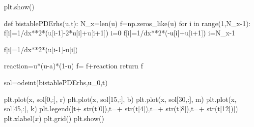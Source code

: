 \documentclass[
  letterpaper,
  DIV=11,
  numbers=noendperiod]{scrreprt}
\newenvironment{Shaded}{\begin{snugshade}}{\end{snugshade}}
\newcommand{\BuiltInTok}[1]{\textcolor[rgb]{0.00,0.23,0.31}{#1}}
\newcommand{\ControlFlowTok}[1]{\textcolor[rgb]{0.00,0.23,0.31}{#1}}
\newcommand{\DecValTok}[1]{\textcolor[rgb]{0.68,0.00,0.00}{#1}}
\newcommand{\KeywordTok}[1]{\textcolor[rgb]{0.00,0.23,0.31}{#1}}
\newcommand{\NormalTok}[1]{\textcolor[rgb]{0.00,0.23,0.31}{#1}}
\newcommand{\OperatorTok}[1]{\textcolor[rgb]{0.37,0.37,0.37}{#1}}
\newcommand{\StringTok}[1]{\textcolor[rgb]{0.13,0.47,0.30}{#1}}
\theoremstyle{plain}
\theoremstyle{definition}
\theoremstyle{plain}
\theoremstyle{remark}
\begin{document}
\begin{Shaded}
\begin{Highlighting}[]
\NormalTok{plt.show()}


\KeywordTok{def}\NormalTok{ bistablePDErhs(u,t):}
\NormalTok{    N\_x}\OperatorTok{=}\BuiltInTok{len}\NormalTok{(u)}
\NormalTok{    f}\OperatorTok{=}\NormalTok{np.zeros\_like(u)}
    \ControlFlowTok{for}\NormalTok{ i }\KeywordTok{in} \BuiltInTok{range}\NormalTok{(}\DecValTok{1}\NormalTok{,N\_x}\OperatorTok{{-}}\DecValTok{1}\NormalTok{):}
\NormalTok{      f[i]}\OperatorTok{=}\DecValTok{1}\OperatorTok{/}\NormalTok{dx}\OperatorTok{**}\DecValTok{2}\OperatorTok{*}\NormalTok{(u[i}\OperatorTok{{-}}\DecValTok{1}\NormalTok{]}\OperatorTok{{-}}\DecValTok{2}\OperatorTok{*}\NormalTok{u[i]}\OperatorTok{+}\NormalTok{u[i}\OperatorTok{+}\DecValTok{1}\NormalTok{]) }
\NormalTok{    i}\OperatorTok{=}\DecValTok{0}
\NormalTok{    f[i]}\OperatorTok{=}\DecValTok{1}\OperatorTok{/}\NormalTok{dx}\OperatorTok{**}\DecValTok{2}\OperatorTok{*}\NormalTok{(}\OperatorTok{{-}}\NormalTok{u[i]}\OperatorTok{+}\NormalTok{u[i}\OperatorTok{+}\DecValTok{1}\NormalTok{]) }
\NormalTok{    i}\OperatorTok{=}\NormalTok{N\_x}\OperatorTok{{-}}\DecValTok{1}

\NormalTok{    f[i]}\OperatorTok{=}\DecValTok{1}\OperatorTok{/}\NormalTok{dx}\OperatorTok{**}\DecValTok{2}\OperatorTok{*}\NormalTok{(u[i}\OperatorTok{{-}}\DecValTok{1}\NormalTok{]}\OperatorTok{{-}}\NormalTok{u[i])}

\NormalTok{    reaction}\OperatorTok{=}\NormalTok{u}\OperatorTok{*}\NormalTok{(u}\OperatorTok{{-}}\NormalTok{a)}\OperatorTok{*}\NormalTok{(}\DecValTok{1}\OperatorTok{{-}}\NormalTok{u) }
\NormalTok{    f}\OperatorTok{=}\NormalTok{ f}\OperatorTok{+}\NormalTok{reaction }
    \ControlFlowTok{return}\NormalTok{ f  }

\NormalTok{sol}\OperatorTok{=}\NormalTok{odeint(bistablePDErhs,u\_0,t)}

\NormalTok{plt.plot(x, sol[}\DecValTok{0}\NormalTok{,:], }\StringTok{\textquotesingle{}r\textquotesingle{}}\NormalTok{)}
\NormalTok{plt.plot(x, sol[}\DecValTok{15}\NormalTok{,:], }\StringTok{\textquotesingle{}b\textquotesingle{}}\NormalTok{)}
\NormalTok{plt.plot(x, sol[}\DecValTok{30}\NormalTok{,:], }\StringTok{\textquotesingle{}m\textquotesingle{}}\NormalTok{)}
\NormalTok{plt.plot(x, sol[}\DecValTok{45}\NormalTok{,:], }\StringTok{\textquotesingle{}k\textquotesingle{}}\NormalTok{)}
\NormalTok{plt.legend([}\StringTok{\textquotesingle{}t\textquotesingle{}}\OperatorTok{+} \BuiltInTok{str}\NormalTok{(t[}\DecValTok{0}\NormalTok{]),}\StringTok{\textquotesingle{}t=\textquotesingle{}}\OperatorTok{+} \BuiltInTok{str}\NormalTok{(t[}\DecValTok{4}\NormalTok{]),}\StringTok{\textquotesingle{}t=\textquotesingle{}}\OperatorTok{+} \BuiltInTok{str}\NormalTok{(t[}\DecValTok{8}\NormalTok{]),}\StringTok{\textquotesingle{}t=\textquotesingle{}}\OperatorTok{+} \BuiltInTok{str}\NormalTok{(t[}\DecValTok{12}\NormalTok{])])}
\NormalTok{plt.xlabel(}\StringTok{\textquotesingle{}$x$\textquotesingle{}}\NormalTok{)}
\NormalTok{plt.grid()}
\NormalTok{plt.show()}
\end{Highlighting}
\end{Shaded}
\end{document}
